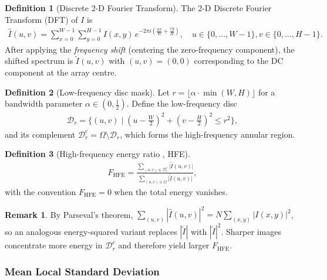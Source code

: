 \documentclass[12pt, xcolor=dvipsnames,svgnames,x11names]{article}
\theoremstyle{definition}
\newtheorem{definition}{Definition}[section]
\newtheorem{remark}{Remark}[section]
\begin{document}
\begin{definition}[Discrete 2-D Fourier Transform]
The 2-D Discrete Fourier Transform (DFT) of $I$ is
\begin{align*}
  \hat{I}(u,v) =
  \sum_{x=0}^{W-1}\sum_{y=0}^{H-1} I(x,y)\,
  e^{-2\pi i\left(\frac{ux}{W}+\frac{vy}{H}\right)},
  \quad u \in \{0,\ldots,W{-}1\}, v\in\{0,\ldots,H{-}1\}.
\end{align*}
After applying the \emph{frequency shift} (centering the zero-frequency
component), the shifted spectrum is $\tilde{I}(u,v)$ with
$(u,v)=(0,0)$ corresponding to the DC component at the array centre.
\end{definition}

\begin{definition}[Low-frequency disc mask]
Let $r = \lfloor \alpha \cdot \min(W,H) \rfloor$ for a bandwidth parameter
$\alpha \in (0,\tfrac{1}{2})$.  Define the low-frequency disc
\begin{align*}
  \mathcal{D}_r =
  \bigl\{(u,v) \mid (u - \tfrac{W}{2})^2 + (v - \tfrac{H}{2})^2 \le r^2\bigr\},
\end{align*}
and its complement $\mathcal{D}_r^c = \Omega \setminus \mathcal{D}_r$, which
forms the high-frequency annular region.
\end{definition}

\begin{definition}[High-frequency energy ratio ,  HFE]
\begin{align*}
  \boxed{F_{\mathrm{HFE}} =
    \frac{\displaystyle\sum_{(u,v)\in \mathcal{D}_r^c}
          \bigl|\tilde{I}(u,v)\bigr|}
         {\displaystyle\sum_{(u,v)\in \Omega}
          \bigl|\tilde{I}(u,v)\bigr|},}
\end{align*}
with the convention $F_{\mathrm{HFE}} = 0$ when the total energy vanishes.
\end{definition}

\begin{remark}
By Parseval's theorem,
$\sum_{(u,v)}|\hat{I}(u,v)|^2 = N\sum_{(x,y)}|I(x,y)|^2$,
so an analogous energy-squared variant replaces $|\tilde{I}|$ with
$|\tilde{I}|^2$.  Sharper images concentrate more energy in
$\mathcal{D}_r^c$ and therefore yield larger $F_{\mathrm{HFE}}$.
\end{remark}


\subsubsection{Mean Local Standard Deviation}
\end{document}
